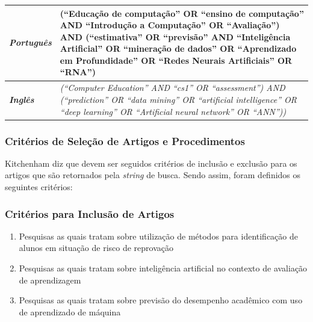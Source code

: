 \documentclass[
	12pt,				%
	openright,			%
	oneside,
	a4paper,			%
	english,			%
	french,				%
	spanish,			%
	brazil,				%
	]{abntex2}
\begin{document}
\begin{table}[!htb]
\centering
\caption{String de Busca}
\label{string-busca}
\begin{longtable}{|| p{3cm} || p{10cm} ||}
    \hline \hline
\textit{\textbf{Português}} & (``Educação de computação'' OR ``ensino de computação'' AND ``Introdução a Computação'' OR ``Avaliação'') AND (``estimativa'' OR ``previsão'' AND ``Inteligência Artificial'' OR ``mineração de dados'' OR ``Aprendizado em Profundidade'' OR ``Redes Neurais Artificiais'' OR ``RNA'')\\
\hline \hline
\textit{\textbf{Inglês}} & \textit{(``Computer Education'' AND ``cs1'' OR ``assessment'') AND (``prediction'' OR ``data mining'' OR ``artificial intelligence'' OR ``deep learning'' OR ``Artificial neural network'' OR ``ANN''))}\\
 \hline \hline
\end{longtable}
\end{table}

\subsubsection{Critérios de Seleção de Artigos e Procedimentos}
Kitchenham \cite{kitchenham2004procedures} diz que devem ser seguidos critérios de inclusão e exclusão para os artigos que são retornados pela \textit{string} de busca. Sendo assim, foram definidos os seguintes critérios:

\subsubsection{Critérios para Inclusão de Artigos}

\begin{enumerate}
    \item Pesquisas as quais tratam sobre utilização de métodos para identificação de alunos em situação de risco de reprovação
    \item Pesquisas as quais tratam sobre inteligência artificial no contexto de avaliação de aprendizagem
    \item Pesquisas as quais tratam sobre previsão do desempenho acadêmico com uso de aprendizado de máquina
\end{enumerate}
\end{document}
